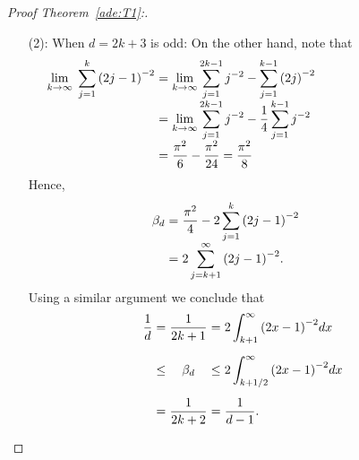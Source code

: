 \begin{proof}[Proof Theorem~\ref{ade:T1}:]
\begin{enumerate}
    \item[(2):] When $d = 2k+3$ is odd:
    On the other hand, note that
    \[\hspace{-35mm}\everymath{\displaystyle}\arraycolsep=1.5pt\def\arraystretch{1.5}
      \begin{array}{rcl}
      \lim_{k\to\infty} \; \sum_{j = 1}^{k} {(2j-1)}^{-2} 
      & = & \lim_{k\to\infty} \sum_{j = 1}^{2k-1} j^{-2} - \sum_{j = 1}^{k-1} {(2j)}^{-2}\\
      & = & \lim_{k\to\infty} \sum_{j = 1}^{2k-1} j^{-2} - \frac{1}{4}\sum_{j = 1}^{k-1} j^{-2}\\
      & = & \frac{\pi^2}{6}-\frac{\pi^2}{24} = \frac{\pi^2}{8}
    \end{array}\]
    Hence,
    \[\hspace{-10mm}\everymath{\displaystyle}\arraycolsep=1.5pt\def\arraystretch{1.5}
    \begin{array}{rll}
      \beta_d & = & \frac{\pi^2}{4} - 2 \sum_{j = 1}^{k} {\left(2j-1\right)}^{-2}\\
      & = & 2\sum_{j = k+1}^{\infty}{\left(2j-1\right)}^{-2}.\\
    \end{array}      
   \]
   Using a similar argument we conclude that
   \[\everymath{\displaystyle}\arraycolsep=1.5pt\def\arraystretch{1.5}
      \begin{array}{rrcrl}
        \frac{1}{d} & = & \frac{1}{2k+1}  & = & 2 \int_{k+1}^{\infty}{(2x-1)}^{-2} dx\\[5mm]
      & \leq & \beta_d    & \leq & 2 \int_{k+1/2}^{\infty}{(2x-1)}^{-2} dx\\[5mm]
      &  = & \frac{1}{2k+2} & = & \frac{1}{d-1}.
    \end{array}  \] 
  \end{enumerate}
\end{proof}

